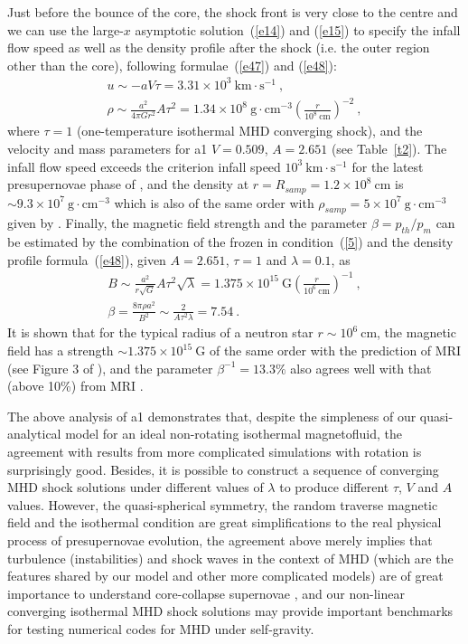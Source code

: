\documentclass[fleqn,usenatbib]{mnras}
\begin{document}
Just before the bounce of the core, the shock front is very close to the centre and we can use the large-$x$ asymptotic solution~(\ref{e14}) and (\ref{e15}) to specify the infall flow speed as well as the density profile after the shock (i.e. the outer region other than the core), following formulae~(\ref{e47}) and (\ref{e48}):
\begin{gather}
u\sim -aV\tau=3.31\times 10^{3}~\mathrm{km\cdot s^{-1}}\ ,\\
\rho\sim \frac{a^{2}}{4\pi Gr^{2}}A\tau^{2}=1.34\times 10^{8}~\mathrm{g\cdot cm^{-3}}\left(\frac{r}{10^{8}~\mathrm{cm}}\right)^{-2}\ ,
\end{gather}
where $\tau=1$ (one-temperature isothermal MHD converging shock), and the velocity and mass parameters for a1 $V=0.509$, $A=2.651$ (see Table~\ref{t2}). The infall flow speed exceeds the criterion infall speed $10^{3}~\mathrm{km\cdot s^{-1}}$ for the latest presupernovae phase of \citet{heger2005presupernova}, and the density at $r=R_{samp}=1.2\times 10^{8}~\mathrm{cm}$ is $\sim 9.3\times 10^{7}~\mathrm{g\cdot cm^{-3}}$ which is also of the same order with $\rho_{samp}=5\times 10^{7}~\mathrm{g\cdot cm^{-3}}$ given by \citet{heger2005presupernova}. Finally, the magnetic field strength and the parameter $\beta=p_{th}/p_{m}$ can be estimated by the combination of the frozen in condition~(\ref{5}) and the density profile formula~(\ref{e48}), given $A=2.651$, $\tau=1$ and $\lambda=0.1$, as
\begin{gather}
B\sim\frac{a^{2}}{r\sqrt{G}}A\tau^{2}\sqrt{\lambda}= 1.375\times 10^{15}~\mathrm{G}\left(\frac{r}{10^{6}~\mathrm{cm}}\right)^{-1}\ ,\\
\beta=\frac{8\pi \rho a^{2}}{B^{2}}\sim \frac{2}{A\tau^{2}\lambda}=7.54\ .
\end{gather}
It is shown that for the typical radius of a neutron star $r\sim 10^{6}~\mathrm{cm}$, the magnetic field has a strength $\sim 1.375\times 10^{15}~\mathrm{G}$ of the same order with the prediction of MRI (see Figure 3 of \citet{akiyama2004magnetic}), and the parameter $\beta^{-1}=13.3\%$ also agrees well with that (above 10\%) from MRI \citep{akiyama2004magnetic}.

The above analysis of a1 demonstrates that, despite the simpleness of our quasi-analytical model for an ideal non-rotating isothermal magnetofluid, the agreement with results from more complicated simulations with rotation is surprisingly good. Besides, it is possible to construct a sequence of converging MHD shock solutions under different values of $\lambda$ to produce different $\tau$, $V$ and $A$ values. However, the quasi-spherical symmetry, the random traverse magnetic field and the isothermal condition are great simplifications to the real physical process of presupernovae evolution, the agreement above merely implies that turbulence (instabilities) and shock waves in the context of MHD (which are the features shared by our model and other more complicated models) are of great importance to understand core-collapse supernovae 
, and our non-linear converging isothermal MHD shock solutions may provide important benchmarks for testing numerical codes for MHD under self-gravity.
\end{document}
